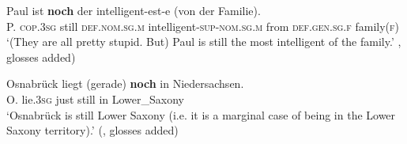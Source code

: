 \begin{exe}
	\ex\label{exAppendixGermanMarginal4}
	\gll Paul ist \textbf{noch} der intelligent-est-e \textup{(}von der Familie\textup{)}.\\
	P. \textsc{cop}.3\textsc{sg} still \textsc{def}.\textsc{nom}.\textsc{sg}.\textsc{m} intelligent-\textsc{sup}-\textsc{nom}.\textsc{sg}.\textsc{m} \phantom{(}from \textsc{def}.\textsc{gen}.\textsc{sg}.\textsc{f} family(\textsc{f})\\
	\glt \lq(They are all pretty stupid. But) Paul is still the most intelligent of the family.\rq{ }\cite[190]{Koenig1977}, glosses added)

	\ex\label{exAppendixGermanMarginal5}
	\gll Osnabrück liegt \textup{(}gerade\textup{)} \textbf{noch} in Niedersachsen.\\
	O. lie.3\textsc{sg} \phantom{(}just still in Lower\_Saxony\\
	\glt \lq Osnabrück is still Lower Saxony (i.e.  it is a marginal case of being in the Lower Saxony territory).' (\cite[1843]{Umbach2012}, glosses added)
\end{exe}
\pagebreak

